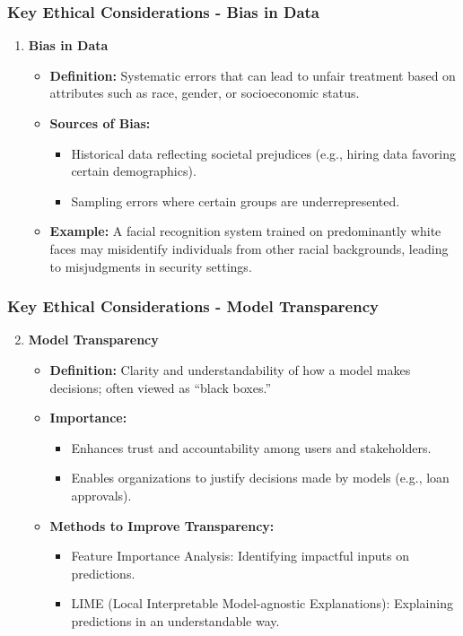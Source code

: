 \documentclass[aspectratio=169]{beamer}
\begin{document}
\begin{frame}[fragile]
  \frametitle{Key Ethical Considerations - Bias in Data}
  \begin{enumerate}
      \item \textbf{Bias in Data}
      \begin{itemize}
          \item \textbf{Definition:} Systematic errors that can lead to unfair treatment based on attributes such as race, gender, or socioeconomic status.
          \item \textbf{Sources of Bias:}
          \begin{itemize}
              \item Historical data reflecting societal prejudices (e.g., hiring data favoring certain demographics).
              \item Sampling errors where certain groups are underrepresented.
          \end{itemize}
          \item \textbf{Example:} A facial recognition system trained on predominantly white faces may misidentify individuals from other racial backgrounds, leading to misjudgments in security settings.
      \end{itemize}
  \end{enumerate}
\end{frame}

\begin{frame}[fragile]
  \frametitle{Key Ethical Considerations - Model Transparency}
  \begin{enumerate}
      \setcounter{enumi}{1} %
      \item \textbf{Model Transparency}
      \begin{itemize}
          \item \textbf{Definition:} Clarity and understandability of how a model makes decisions; often viewed as “black boxes.”
          \item \textbf{Importance:}
          \begin{itemize}
              \item Enhances trust and accountability among users and stakeholders.
              \item Enables organizations to justify decisions made by models (e.g., loan approvals).
          \end{itemize}
          \item \textbf{Methods to Improve Transparency:}
          \begin{itemize} 
              \item Feature Importance Analysis: Identifying impactful inputs on predictions.
              \item LIME (Local Interpretable Model-agnostic Explanations): Explaining predictions in an understandable way.
          \end{itemize}
      \end{itemize}
  \end{enumerate}
\end{frame}
\end{document}
